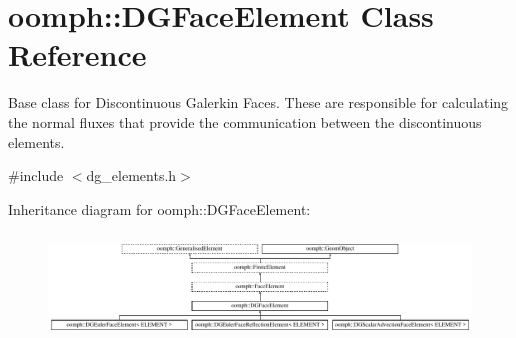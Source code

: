 \hypertarget{classoomph_1_1DGFaceElement}{}\section{oomph\+:\+:D\+G\+Face\+Element Class Reference}
\label{classoomph_1_1DGFaceElement}


Base class for Discontinuous Galerkin Faces. These are responsible for calculating the normal fluxes that provide the communication between the discontinuous elements.  




{\ttfamily \#include $<$dg\+\_\+elements.\+h$>$}

Inheritance diagram for oomph\+:\+:D\+G\+Face\+Element\+:\begin{figure}[H]
\begin{center}
\leavevmode
\includegraphics[height=2.828283cm]{classoomph_1_1DGFaceElement}
\end{center}
\end{figure}
